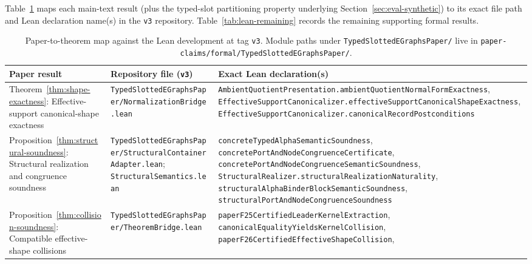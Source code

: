 Table~\ref{tab:lean-correspondence} maps each main-text result (plus the
typed-slot partitioning property underlying Section~\ref{sec:eval-synthetic})
to its exact file path and Lean declaration name(s) in the \texttt{v3}
repository. Table~\ref{tab:lean-remaining} records the remaining supporting
formal results.

\begin{table}[ht]
\centering
\caption{Paper-to-theorem map against the Lean development at tag
\texttt{v3}. Module paths under \texttt{TypedSlottedEGraphsPaper/} live in
\texttt{paper-claims/formal/TypedSlottedEGraphsPaper/}.}
\label{tab:lean-correspondence}
\scriptsize
\setlength{\tabcolsep}{2.2pt}
\begin{tabular}{@{}%
>{\raggedright\arraybackslash}p{3.0cm}%
>{\raggedright\arraybackslash}p{3.0cm}%
>{\raggedright\arraybackslash}p{5.75cm}@{}}
\toprule
Paper result & Repository file (\texttt{v3}) & Exact Lean declaration(s)\\
\midrule
Theorem~\ref{thm:shape-exactness}: Effective-support canonical-shape exactness &
\texttt{TypedSlottedEGraphs\allowbreak Paper/\allowbreak Normalization\allowbreak Bridge.lean} &
\texttt{AmbientQuotient\allowbreak Presentation.\allowbreak ambientQuotientNormal\allowbreak FormExactness},
\texttt{EffectiveSupport\allowbreak Canonicalizer.\allowbreak effectiveSupportCanonical\allowbreak ShapeExactness},
\texttt{EffectiveSupport\allowbreak Canonicalizer.\allowbreak canonicalRecord\allowbreak Postconditions}\\[4pt]
Proposition~\ref{thm:structural-soundness}: Structural realization and congruence soundness &
\texttt{TypedSlottedEGraphs\allowbreak Paper/\allowbreak StructuralContainer\allowbreak Adapter.lean};
\texttt{Structural\allowbreak Semantics.lean} &
\texttt{concreteTypedAlpha\allowbreak SemanticSoundness},
\texttt{concretePortAndNode\allowbreak CongruenceCertificate},
\texttt{concretePortAndNode\allowbreak CongruenceSemanticSoundness},
\texttt{StructuralRealizer.\allowbreak structuralRealizationNaturality},
\texttt{structuralAlphaBinderBlock\allowbreak SemanticSoundness},
\texttt{structuralPortAndNode\allowbreak CongruenceSoundness}\\[4pt]
Proposition~\ref{thm:collision-soundness}: Compatible effective-shape collisions &
\texttt{TypedSlottedEGraphs\allowbreak Paper/\allowbreak TheoremBridge.lean} &
\texttt{paperF25CertifiedLeader\allowbreak KernelExtraction},
\texttt{canonicalEqualityYields\allowbreak KernelCollision},
\texttt{paperF26CertifiedEffective\allowbreak ShapeCollision},

\end{tabular}
\end{table}
